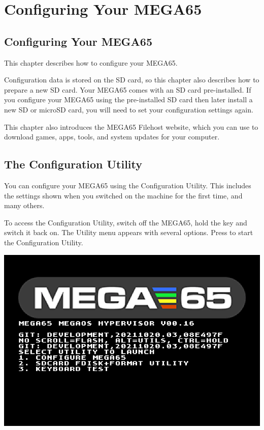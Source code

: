 \chapter{Configuring Your MEGA65}

\section{Configuring Your MEGA65}
\label{cha:configuringyourmega}

This chapter describes how to configure your MEGA65.

Configuration data is stored on the SD card, so this chapter also describes how to prepare a new SD card. Your MEGA65 comes with an SD card pre-installed. If you configure your MEGA65 using the pre-installed SD card then later install a new SD or microSD card, you will need to set your configuration settings again.

This chapter also introduces the MEGA65 Filehost website, which you can use to download games, apps, tools, and system updates for your computer.

\section{The Configuration Utility}
\label{sec:configuration-utility}

You can configure your MEGA65 using the Configuration Utility. This includes the settings shown when you switched on the machine for the first time, and many others.

To access the Configuration Utility, switch off the MEGA65, hold the  key and switch it back on. The Utility menu appears with several options. Press  to start the Configuration Utility.

\begin{center}
  \includegraphics[width=0.7\linewidth]{images/ss-utilmenu.png}
\end{center}

